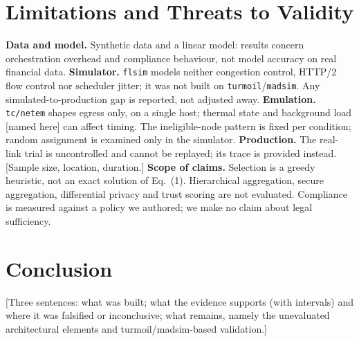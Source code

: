\section{Limitations and Threats to Validity}
\label{sec:limits}
\textbf{Data and model.} Synthetic data and a linear model: results concern orchestration overhead and compliance behaviour, not model accuracy on real financial data.
\textbf{Simulator.} \texttt{flsim} models neither congestion control, HTTP/2 flow control nor scheduler jitter; it was not built on \texttt{turmoil}/\texttt{madsim}. Any simulated-to-production gap is reported, not adjusted away.
\textbf{Emulation.} \texttt{tc/netem} shapes egress only, on a single host; thermal state and background load [named here] can affect timing. The ineligible-node pattern is fixed per condition; random assignment is examined only in the simulator.
\textbf{Production.} The real-link trial is uncontrolled and cannot be replayed; its trace is provided instead. [Sample size, location, duration.]
\textbf{Scope of claims.} Selection is a greedy heuristic, not an exact solution of Eq.~(1). Hierarchical aggregation, secure aggregation, differential privacy and trust scoring are not evaluated. Compliance is measured against a policy we authored; we make no claim about legal sufficiency.

\section{Conclusion}
[Three sentences: what was built; what the evidence supports (with intervals) and where it was falsified or inconclusive; what remains, namely the unevaluated architectural elements and turmoil/madsim-based validation.]
